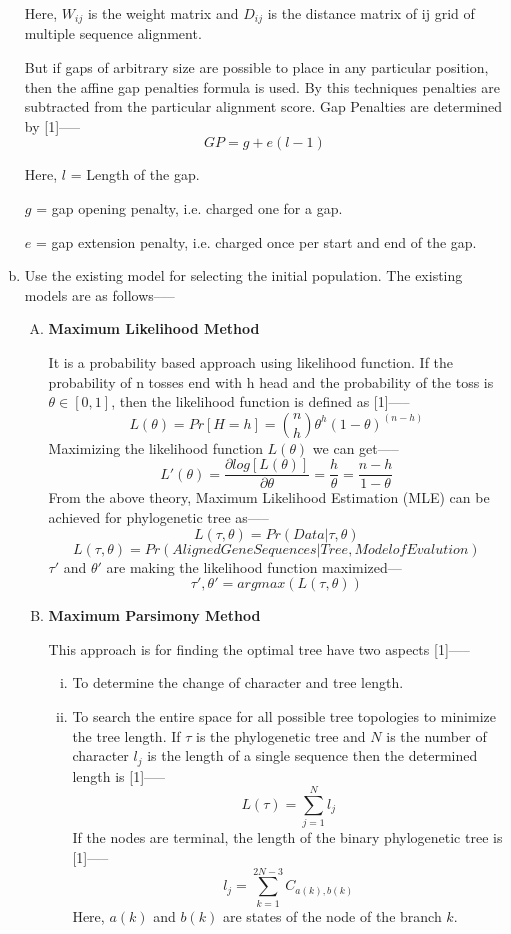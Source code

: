 \documentclass[preprint,12pt]{elsarticle}
\begin{document}
\begin{enumerate}[a)]
    Here, $W_{ij}$ is the weight matrix and $D_{ij}$ is the distance matrix of ij grid of multiple sequence alignment.
    
But if gaps of arbitrary size are possible to place in any particular position, then the affine gap penalties formula is used. By this techniques penalties are subtracted from the particular alignment score. Gap Penalties are determined by [1]—--
$$GP=g+e(l-1)$$

Here, $l$ = Length of the gap.

$g$ = gap opening penalty, i.e. charged one for a gap.

$e$ = gap extension penalty, i.e. charged once per start and end of the gap. 
	\item Use the existing model for selecting the initial population. The existing models are as follows--— 
  
\begin{enumerate}[(A)]
\item \textbf{Maximum Likelihood Method}

It is a probability based approach using likelihood function. If the probability of n tosses end with h head and the probability of the toss is $\theta \in [0, 1]$, then the likelihood function is defined as [1]—--
$$L(\theta)=Pr⁡[H=h]= \binom{n}{h} {\theta}^h (1-\theta)^{(n-h)}$$
Maximizing the likelihood function $L(\theta)$ we can get—--
$$L'(\theta)=\frac{\partial log[L(\theta)]}{\partial \theta}=\frac{h}{\theta}=\frac{n-h}{1-\theta}$$
From the above theory, Maximum Likelihood Estimation (MLE) can be achieved for phylogenetic tree as—--
$$L(\tau,\theta)=Pr(Data|\tau,\theta)$$
$$L(\tau,\theta)=Pr(Aligned Gene Sequences| Tree, Model of Evalution)$$
$\tau'$ and $\theta'$ are making the likelihood function maximized---
$$\tau',\theta'=argmax (L(\tau,\theta))$$
\item \textbf{Maximum Parsimony Method}

This approach is for finding the optimal tree have two aspects [1]—--
\begin{enumerate}[(i)]
\item To determine the change of character and tree length.
\item To search the entire space for all possible tree topologies to minimize the tree length.
If $\tau$ is the phylogenetic tree and $N$ is the number of character $l_j$ is the length of a single sequence then the determined length is [1]—--
$$L(\tau)=\sum_{j=1}^{N} l_j$$
If the nodes are terminal, the length of the binary phylogenetic tree is [1]—--
$$l_j=\sum_{k=1}^{2N-3} C_{a(k),b(k)}$$
Here, $a(k)$ and $b(k)$ are states of the node of the branch $k$.
\end{enumerate}



\end{enumerate}
\end{enumerate}
\end{document}
